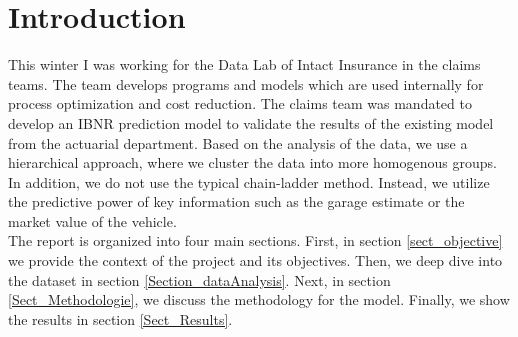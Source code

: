 \section{Introduction}
This winter I was working for the Data Lab of Intact Insurance in the claims teams. The team develops programs and models which are used internally for process optimization and cost reduction. The claims team was mandated to develop an IBNR prediction model to validate the results of the existing model from the actuarial department. Based on the analysis of the data, we use a hierarchical approach, where we cluster the data into more homogenous groups. In addition, we do not use the typical chain-ladder method. Instead, we utilize the predictive power of key information such as the garage estimate or the market value of the vehicle. \\
The report is organized into four main sections. First, in section \ref{sect_objective} we provide the context of the project and its objectives. Then, we deep dive into the dataset in section \ref{Section_dataAnalysis}. Next, in section \ref{Sect_Methodologie}, we discuss the methodology for the model. Finally, we show the results in section \ref{Sect_Results}.

	
